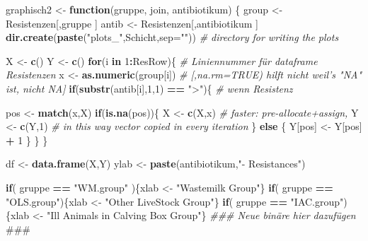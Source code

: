 \documentclass[
]{article}
\newenvironment{Shaded}{\begin{snugshade}}{\end{snugshade}}
\newcommand{\AlertTok}[1]{\textcolor[rgb]{0.94,0.16,0.16}{#1}}
\newcommand{\CommentTok}[1]{\textcolor[rgb]{0.56,0.35,0.01}{\textit{#1}}}
\newcommand{\ControlFlowTok}[1]{\textcolor[rgb]{0.13,0.29,0.53}{\textbf{#1}}}
\newcommand{\DataTypeTok}[1]{\textcolor[rgb]{0.13,0.29,0.53}{#1}}
\newcommand{\DecValTok}[1]{\textcolor[rgb]{0.00,0.00,0.81}{#1}}
\newcommand{\KeywordTok}[1]{\textcolor[rgb]{0.13,0.29,0.53}{\textbf{#1}}}
\newcommand{\NormalTok}[1]{#1}
\newcommand{\OperatorTok}[1]{\textcolor[rgb]{0.81,0.36,0.00}{\textbf{#1}}}
\newcommand{\StringTok}[1]{\textcolor[rgb]{0.31,0.60,0.02}{#1}}
\begin{document}
\begin{Shaded}
\begin{Highlighting}[]
\NormalTok{graphisch2 <-}\StringTok{ }\ControlFlowTok{function}\NormalTok{(gruppe, join, antibiotikum) \{}
\NormalTok{  group <-}\StringTok{ }\NormalTok{Resistenzen[,gruppe ] }
\NormalTok{  antib      <-}\StringTok{ }\NormalTok{Resistenzen[,antibiotikum ]}
  \KeywordTok{dir.create}\NormalTok{(}\KeywordTok{paste}\NormalTok{(}\StringTok{"plots_"}\NormalTok{,Schicht,}\DataTypeTok{sep=}\StringTok{""}\NormalTok{))             }\CommentTok{# directory for writing the plots}

\NormalTok{  X <-}\StringTok{ }\KeywordTok{c}\NormalTok{()}
\NormalTok{  Y <-}\StringTok{ }\KeywordTok{c}\NormalTok{()}
  \ControlFlowTok{for}\NormalTok{(i }\ControlFlowTok{in} \DecValTok{1}\OperatorTok{:}\NormalTok{ResRow)\{                      }\CommentTok{# Liniennummer für dataframe Resistenzen}
\NormalTok{    x <-}\StringTok{ }\KeywordTok{as.numeric}\NormalTok{(group[i])              }\CommentTok{# [,na.rm=TRUE) hilft nicht weil's "NA" ist, nicht NA]}
    \ControlFlowTok{if}\NormalTok{(}\KeywordTok{substr}\NormalTok{(antib[i],}\DecValTok{1}\NormalTok{,}\DecValTok{1}\NormalTok{) }\OperatorTok{==}\StringTok{ ">"}\NormalTok{)\{       }\CommentTok{# wenn Resistenz}
      
\NormalTok{      pos <-}\StringTok{ }\KeywordTok{match}\NormalTok{(x,X)                   }
      \ControlFlowTok{if}\NormalTok{(}\KeywordTok{is.na}\NormalTok{(pos))\{}
\NormalTok{        X <-}\StringTok{ }\KeywordTok{c}\NormalTok{(X,x)    }\CommentTok{# faster: pre-allocate+assign,}
\NormalTok{        Y <-}\StringTok{ }\KeywordTok{c}\NormalTok{(Y,}\DecValTok{1}\NormalTok{)    }\CommentTok{# in this way vector copied in every iteration}
\NormalTok{      \} }\ControlFlowTok{else}\NormalTok{ \{}
\NormalTok{        Y[pos] <-}\StringTok{ }\NormalTok{Y[pos] }\OperatorTok{+}\StringTok{ }\DecValTok{1}
\NormalTok{      \}}
\NormalTok{    \}}
\NormalTok{  \}  }

\NormalTok{  df <-}\StringTok{ }\KeywordTok{data.frame}\NormalTok{(X,Y)}
\NormalTok{  ylab <-}\StringTok{ }\KeywordTok{paste}\NormalTok{(antibiotikum,}\StringTok{"- Resistances"}\NormalTok{)}
  
  \ControlFlowTok{if}\NormalTok{( gruppe }\OperatorTok{==}\StringTok{ "WM.group"}\NormalTok{ )\{xlab <-}\StringTok{ "Wastemilk Group"}\NormalTok{\}}
  \ControlFlowTok{if}\NormalTok{( gruppe }\OperatorTok{==}\StringTok{ "OLS.group"}\NormalTok{)\{xlab <-}\StringTok{ "Other LiveStock Group"}\NormalTok{\}            }
  \ControlFlowTok{if}\NormalTok{( gruppe }\OperatorTok{==}\StringTok{ "IAC.group"}\NormalTok{)\{xlab <-}\StringTok{ "Ill Animals in Calving Box Group"}\NormalTok{\}}
  \CommentTok{### Neue binäre hier dazufügen }\AlertTok{###}


\end{Highlighting}
\end{Shaded}
\end{document}
